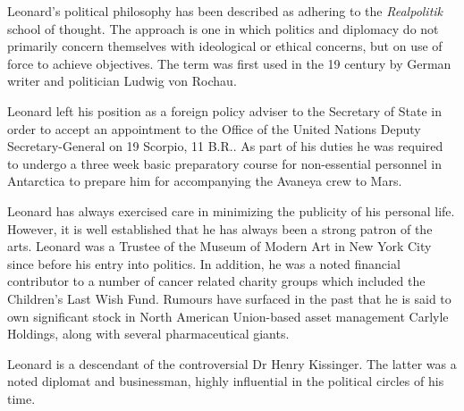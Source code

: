 Leonard's political philosophy has been described as adhering to the {\it Realpolitik} school of thought. The approach is one in which politics and diplomacy do not primarily concern themselves with ideological or ethical concerns, but on use of force to achieve objectives. The term was first used in the 19 century by German writer and politician Ludwig von Rochau.

Leonard left his position as a foreign policy adviser to the Secretary of State in order to accept an appointment to the Office of the United Nations Deputy Secretary-General on 19 Scorpio, 11 B.R.. As part of his duties he was required to undergo a three week basic preparatory course for non-essential personnel in Antarctica to prepare him for accompanying the Avaneya crew to Mars.

Leonard has always exercised care in minimizing the publicity of his personal life. However, it is well established that he has always been a strong patron of the arts. Leonard was a Trustee of the Museum of Modern Art in New York City since before his entry into politics. In addition, he was a noted financial contributor to a number of cancer related charity groups which included the Children's Last Wish Fund. Rumours have surfaced in the past that he is said to own significant stock in North American Union-based asset management Carlyle Holdings, along with several pharmaceutical giants.

Leonard is a descendant of the controversial Dr Henry Kissinger. The latter was a noted diplomat and businessman, highly influential in the political circles of his time.

